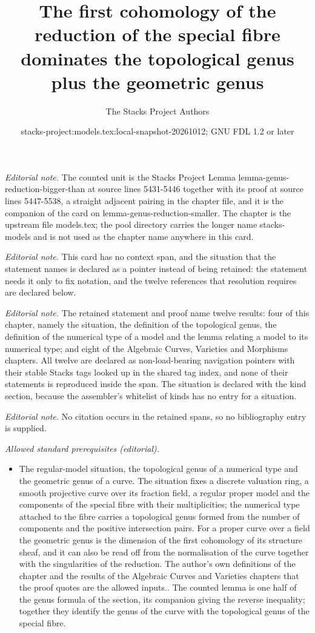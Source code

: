 \documentclass[10pt,a4paper]{amsart}
\title{The first cohomology of the reduction of the special fibre dominates the topological genus plus the geometric genus}
\author{The Stacks Project Authors}
\date{stacks-project:models.tex:local-snapshot-20261012; GNU FDL 1.2 or later}
\theoremstyle{plain}
\theoremstyle{definition}
\theoremstyle{remark}
\numberwithin{equation}{subsection}
\begin{document}
\maketitle
\noindent\textit{Editorial note.} The counted unit is the Stacks Project Lemma lemma-genus-reduction-bigger-than at source lines 5431-5446 together with its proof at source lines 5447-5538, a straight adjacent pairing in the chapter file, and it is the companion of the card on lemma-genus-reduction-smaller. The chapter is the upstream file models.tex; the pool directory carries the longer name stacks-models and is not used as the chapter name anywhere in this card.\par\medskip
\noindent\textit{Editorial note.} This card has no context span, and the situation that the statement names is declared as a pointer instead of being retained: the statement needs it only to fix notation, and the twelve references that resolution requires are declared below.\par\medskip
\noindent\textit{Editorial note.} The retained statement and proof name twelve results: four of this chapter, namely the situation, the definition of the topological genus, the definition of the numerical type of a model and the lemma relating a model to its numerical type; and eight of the Algebraic Curves, Varieties and Morphisms chapters. All twelve are declared as non-load-bearing navigation pointers with their stable Stacks tags looked up in the shared tag index, and none of their statements is reproduced inside the span. The situation is declared with the kind section, because the assembler's whitelist of kinds has no entry for a situation.\par\medskip
\noindent\textit{Editorial note.} No citation occurs in the retained spans, so no bibliography entry is supplied.\par\medskip
\noindent\textit{Allowed standard prerequisites (editorial).}\begin{itemize}
\item The regular-model situation, the topological genus of a numerical type and the geometric genus of a curve. The situation fixes a discrete valuation ring, a smooth projective curve over its fraction field, a regular proper model and the components of the special fibre with their multiplicities; the numerical type attached to the fibre carries a topological genus formed from the number of components and the positive intersection pairs. For a proper curve over a field the geometric genus is the dimension of the first cohomology of its structure sheaf, and it can also be read off from the normalisation of the curve together with the singularities of the reduction. The author's own definitions of the chapter and the results of the Algebraic Curves and Varieties chapters that the proof quotes are the allowed inputs.. The counted lemma is one half of the genus formula of the section, its companion giving the reverse inequality; together they identify the genus of the curve with the topological genus of the special fibre.
\end{itemize}\medskip
\end{document}

